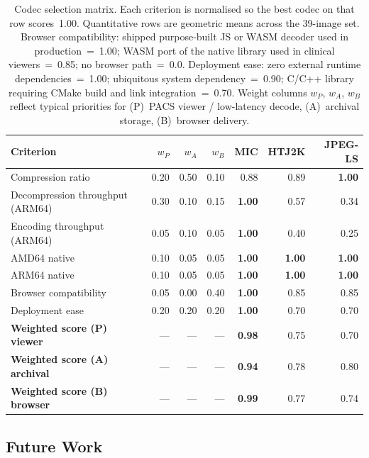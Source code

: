 \documentclass[journal]{IEEEtran}
\begin{document}
\begin{table}[htbp]
\centering
\caption{Codec selection matrix. Each criterion is normalised so the
best codec on that row scores~1.00. Quantitative rows are geometric
means across the 39-image set. Browser compatibility: shipped
purpose-built JS or WASM decoder used in production~=~1.00; WASM port of
the native library used in clinical viewers~=~0.85; no browser
path~=~0.0. Deployment ease: zero external runtime dependencies~=~1.00;
ubiquitous system dependency~=~0.90; C/C++ library requiring CMake build
and link integration~=~0.70. Weight columns $w_P$, $w_A$, $w_B$ reflect
typical priorities for (P)~PACS viewer / low-latency decode, (A)~archival
storage, (B)~browser delivery.}
\label{tab:decision-matrix}
\scriptsize
\setlength{\tabcolsep}{3pt}
\begin{tabular}{lrrrrrr}
\toprule
Criterion & $w_P$ & $w_A$ & $w_B$ & MIC & HTJ2K & JPEG-LS \\
\midrule
Compression ratio                & 0.20 & 0.50 & 0.10 & 0.88 & 0.89 & \textbf{1.00} \\
Decompression throughput (ARM64) & 0.30 & 0.10 & 0.15 & \textbf{1.00} & 0.57 & 0.34 \\
Encoding throughput (ARM64)      & 0.05 & 0.10 & 0.05 & \textbf{1.00} & 0.40 & 0.25 \\
AMD64 native                     & 0.10 & 0.05 & 0.05 & \textbf{1.00} & \textbf{1.00} & \textbf{1.00} \\
ARM64 native                     & 0.10 & 0.05 & 0.05 & \textbf{1.00} & \textbf{1.00} & \textbf{1.00} \\
Browser compatibility            & 0.05 & 0.00 & 0.40 & \textbf{1.00} & 0.85 & 0.85 \\
Deployment ease                  & 0.20 & 0.20 & 0.20 & \textbf{1.00} & 0.70 & 0.70 \\
\midrule
\textbf{Weighted score (P) viewer}   & --- & --- & --- & \textbf{0.98} & 0.75 & 0.70 \\
\textbf{Weighted score (A) archival} & --- & --- & --- & \textbf{0.94} & 0.78 & 0.80 \\
\textbf{Weighted score (B) browser}  & --- & --- & --- & \textbf{0.99} & 0.77 & 0.74 \\
\bottomrule
\end{tabular}
\end{table}

\subsection{Future Work}
\end{document}
